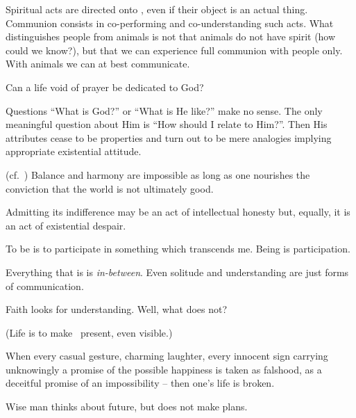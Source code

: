 
\pa
Spiritual acts are directed onto \HH, even if their object is an
actual thing. Communion consists in co-performing and co-understanding
such acts. What distinguishes people from animals is not that animals
do not have spirit (how could we know?), but that we can experience
full communion with people only. With animals we can at best communicate.

\pa
Can a life void of prayer be dedicated to God?

\pa
Questions ``What is God?'' or ``What is He like?'' make no sense. The
only meaningful question about Him is ``How should I relate to
Him?''. Then His attributes cease to be properties and turn out to be
mere analogies implying appropriate existential attitude.

\pa\label{ugood} (cf.~)
Balance and harmony are impossible as long as one nourishes the
conviction that the world is not ultimately good.

Admitting its indifference may be an act of intellectual honesty but,
equally, it is an act of existential despair.

\pa
To be is to participate in something which transcends me. Being is participation.

\pa
Everything that is is {\em in-between}. Even solitude and
understanding are just forms of communication.

\pa
Faith looks for understanding. Well, what does not? 

(Life is to make \HH\ present, even visible.)



\pa
When every casual gesture, charming laughter, every innocent sign carrying
unknowingly a promise of the
possible happiness is taken as falshood, as a deceitful promise of an
impossibility -- then one's life is broken. 

\pa
Wise man thinks about future, but does not make plans.



